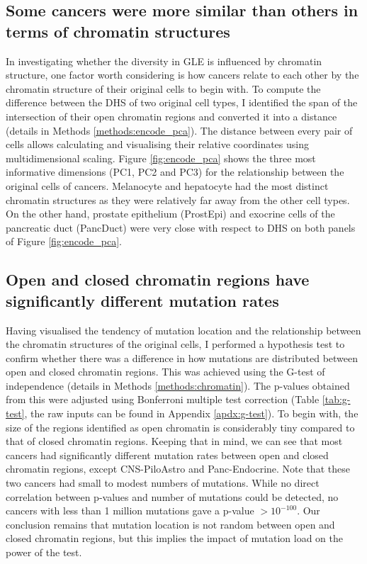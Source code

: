 \subsection{Some cancers were more similar than others in terms of chromatin structures}
In investigating whether the diversity in GLE is influenced by chromatin structure, one factor worth considering is how cancers relate to each other by the chromatin structure of their original cells to begin with. To compute the difference between the DHS of two original cell types, I identified the span of the intersection of their open chromatin regions and converted it into a distance (details in Methods \ref{methods:encode_pca}). The distance between every pair of cells allows calculating and visualising their relative coordinates using multidimensional scaling. Figure \ref{fig:encode_pca} shows the three most informative dimensions (PC1, PC2 and PC3) for the relationship between the original cells of cancers. Melanocyte and hepatocyte had the most distinct chromatin structures as they were relatively far away from the other cell types. On the other hand, prostate epithelium (ProstEpi) and exocrine cells of the pancreatic duct (PancDuct) were very close with respect to DHS on both panels of Figure \ref{fig:encode_pca}.


\newpage

\subsection{Open and closed chromatin regions have significantly different mutation rates}
Having visualised the tendency of mutation location and the relationship between the chromatin structures of the original cells, I performed a hypothesis test to confirm whether there was a difference in how mutations are distributed between open and closed chromatin regions. This was achieved using the G-test of independence (details in Methods \ref{methods:chromatin}). The p-values obtained from this were adjusted using Bonferroni multiple test correction (Table \ref{tab:g-test}, the raw inputs can be found in Appendix \ref{apdx:g-test}). To begin with, the size of the regions identified as open chromatin is considerably tiny compared to that of closed chromatin regions. Keeping that in mind, we can see that most cancers had significantly different mutation rates between open and closed chromatin regions, except CNS-PiloAstro and Panc-Endocrine. Note that these two cancers had small to modest numbers of mutations. While no direct correlation between p-values and number of mutations could be detected, no cancers with less than 1 million mutations gave a p-value $>10^{-100}$. Our conclusion remains that mutation location is not random between open and closed chromatin regions, but this implies the impact of mutation load on the power of the test. 

